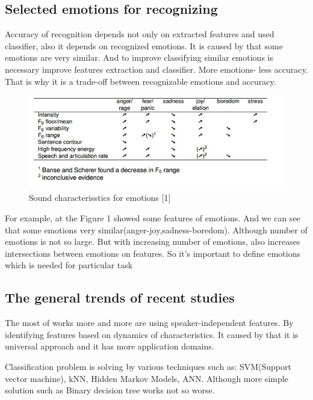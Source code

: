 \documentclass[12pt, letterpaper]{article}
\begin{document}
\subsection{Selected emotions for recognizing}
Accuracy of recognition depends not only on extracted features and used classifier, also it depends on recognized emotions. It is caused by that some emotions are very similar. And to improve classifying similar emotions is necessary improve features extraction and classifier. More emotions- less accuracy. That is why it is a trade-off between recognizable emotions and accuracy.
\begin{figure}[t]
	\centering
	\includegraphics[scale=0.8]{emotion-table-example}
	\caption{Sound characterisstics for emotions [1]}
	\label{fig:emotion-table-example}
\end{figure}

For example, at the Figure 1 showed some features of emotions. And we can see that some emotions very similar(anger-joy,sadness-boredom). Although number of emotions is not so large. But with increasing number of emotions, also increases intersections between emotions on features. So it's important to define emotions which is needed for particular task
\subsection{The general trends of recent studies}
The most of works more and more are using speaker-independent features. By identifying features based on dynamics of characteristics. It caused by that it is universal approach and it has more application domains.

Classification problem is solving by various techniques such as: SVM(Support vector machine), kNN, Hidden Markov Models, ANN. Although more simple solution such as Binary decision tree works not so worse.
\end{document}
